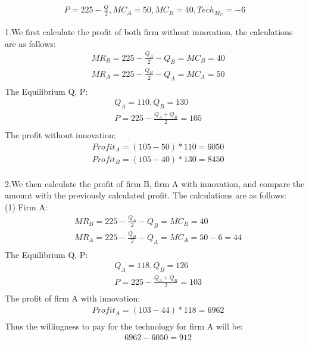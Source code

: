 \documentclass[a4paper]{article}
\begin{document}
    \begin{answer}[Cement (1)]
    \begin{align*}
        P = 225 - \frac{Q}{2}, MC_A = 50, MC_B = 40, Tech_M_C = -6
    \end{align*}
    
    1.We first calculate the profit of both firm without innovation, the calculations are as follows:
    \begin{align*}
        & MR_B = 225 - \frac{Q_A}{2} - Q_B = MC_B = 40\\
        & MR_A = 225 - \frac{Q_B}{2} - Q_A = MC_A = 50\\
    \end{align*}
    The Equilibrium Q, P:
    \begin{align*}
        & Q_A = 110, Q_B = 130\\
        & P = 225 - \frac{Q_A + Q_B}{2} = 105\\
    \end{align*}
    The profit without innovation:
    \begin{align*}
        & Profit_A = (105-50)*110 = 6050\\
        & Profit_B = (105-40)*130 = 8450\\
    \end{align*}
    
    2.We then calculate the profit of firm B, firm A with innovation, and compare the amount with the previously calculated profit. The calculations are as follows:\\
    (1) Firm A:\\
    \begin{align*}
        & MR_B = 225 - \frac{Q_A}{2} - Q_B = MC_B = 40\\
        & MR_A = 225 - \frac{Q_B}{2} - Q_A = MC_A = 50 - 6 = 44\\
    \end{align*}
    The Equilibrium Q, P:
    \begin{align*}
        & Q_A = 118, Q_B = 126\\
        & P = 225 - \frac{Q_A + Q_B}{2} = 103\\
    \end{align*}
    The profit of firm A with innovation:
    \begin{align*}
        & Profit_A = (103-44)*118 = 6962\\
    \end{align*}
    Thus the willingness to pay for the technology for firm A will be: \\
    \begin{align*}
        & 6962 - 6050 = 912\\
    \end{align*}
    

\end{answer}
\end{document}
